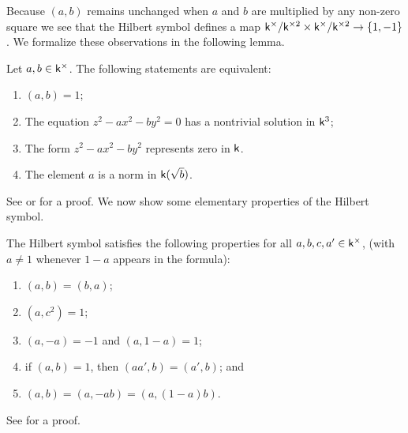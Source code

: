 Because \((a, b)\) remains unchanged when \(a\) and \(b\) are multiplied by any
non-zero square we see that the Hilbert symbol defines a map \(\mathsf{k}^{\times}/\mathsf{k}^{\times2}
\times \mathsf{k}^{\times}/\mathsf{k}^{\times2} \to \{1, -1\}\). We formalize these observations in the
following lemma.
\begin{lemma}
    Let \(a, b \in \mathsf{k}^{\times}\). The following statements are equivalent:

    \medskip

    \begin{enumerate}[nosep, label=(\alph*)]
        \item \((a, b) = 1\);
        \item The equation \(z^2 - ax^2 - by^2 = 0\) has a nontrivial solution
        in \(\mathsf{k}^3\);
        \item The form \(z^2 - ax^2 - by^2\) represents zero in \(\mathsf{k}\).
        \item The element \(a\) is a norm in \(\mathsf{k}(\sqrt{b})\).
    \end{enumerate}
\end{lemma}

See \cite[pp.~17--18]{serre2012course} or
\cite[p.~1]{sutherland2013introduction10} for a proof. We now show some
elementary properties of the Hilbert symbol.

\begin{theorem}
    The Hilbert symbol satisfies the following properties for all \(a, b, c, a'
    \in \mathsf{k}^{\times}\), (with \(a \neq 1\) whenever \(1-a\) appears in the formula):

    \smallskip

    \begin{enumerate}[nosep, label=(\alph*)]
        \item \((a, b) = (b, a)\);
        \item \((a, c^2) = 1\);
        \item \((a, -a) = -1\) and \((a, 1-a) = 1\);
        \item if \((a, b) = 1\), then \((aa', b) = (a', b)\); and
        \item \((a, b) = (a, -ab) = (a, (1-a)b)\).\label{item:formula-e}
    \end{enumerate}
\end{theorem}

See \cite[pp.~19--21]{serre2012course} for a proof.

